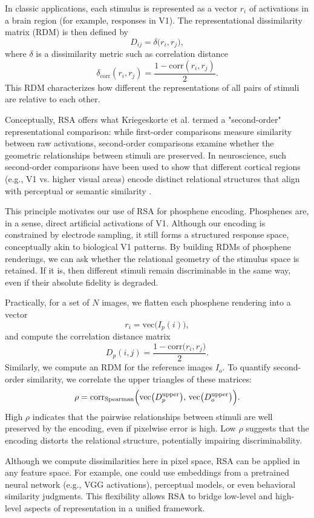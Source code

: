 In classic applications, each stimulus is represented as a vector \(r_i\) of activations in a brain region (for example, responses in V1). The representational dissimilarity matrix (RDM) is then defined by
\[
D_{ij} = \delta\bigl(r_i, r_j\bigr),
\]
where \(\delta\) is a dissimilarity metric such as correlation distance
\[
\delta_{\mathrm{corr}}(r_i, r_j) = \frac{1 - \mathrm{corr}(r_i, r_j)}{2}.
\]
This RDM characterizes how different the representations of all pairs of stimuli are relative to each other. 

Conceptually, RSA offers what Kriegeskorte et al. termed a "second-order" representational comparison: while first-order comparisons measure similarity between raw activations, second-order comparisons examine whether the geometric relationships between stimuli are preserved. In neuroscience, such second-order comparisons have been used to show that different cortical regions (e.g., V1 vs. higher visual areas) encode distinct relational structures that align with perceptual or semantic similarity \cite{Wang2018}.

This principle motivates our use of RSA for phosphene encoding. Phosphenes are, in a sense, direct artificial activations of V1. Although our encoding is constrained by electrode sampling, it still forms a structured response space, conceptually akin to biological V1 patterns. By building RDMs of phosphene renderings, we can ask whether the relational geometry of the stimulus space is retained. If it is, then different stimuli remain discriminable in the same way, even if their absolute fidelity is degraded.

Practically, for a set of \(N\) images, we flatten each phosphene rendering into a vector
\[
r_i = \mathrm{vec}\bigl(I_p(i)\bigr),
\]
and compute the correlation distance matrix
\[
D_p(i,j) = \frac{1 - \mathrm{corr}\bigl(r_i, r_j\bigr)}{2}.
\]
Similarly, we compute an RDM for the reference images \(I_o\). To quantify second-order similarity, we correlate the upper triangles of these matrices:
\[
\rho = \mathrm{corr}_{\mathrm{Spearman}}\Bigl(\mathrm{vec}\bigl(D_p^{\mathrm{upper}}\bigr), \,\mathrm{vec}\bigl(D_o^{\mathrm{upper}}\bigr)\Bigr).
\]
High \(\rho\) indicates that the pairwise relationships between stimuli are well preserved by the encoding, even if pixelwise error is high. Low \(\rho\) suggests that the encoding distorts the relational structure, potentially impairing discriminability.

Although we compute dissimilarities here in pixel space, RSA can be applied in any feature space. For example, one could use embeddings from a pretrained neural network (e.g., VGG activations), perceptual models, or even behavioral similarity judgments. This flexibility allows RSA to bridge low-level and high-level aspects of representation in a unified framework.

